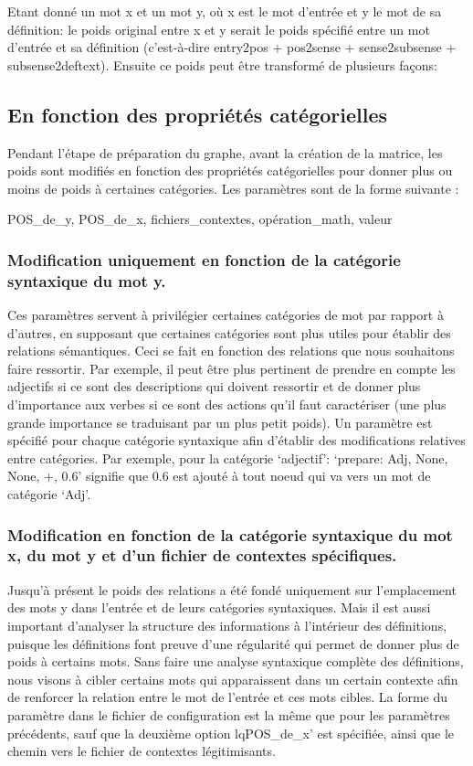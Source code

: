 Etant donné un mot x et un mot y, où x est le mot d'entrée et y le mot de sa 
définition: le poids original entre x et y serait le poids spécifié entre un mot d'entrée et 
sa définition (c'est-à-dire entry2pos + pos2sense + sense2subsense + 
subsense2deftext). Ensuite ce poids peut être transformé de plusieurs façons:

\subsection{En fonction des propriétés catégorielles}
Pendant l'étape de préparation du graphe, avant la création de la matrice, les 
poids sont modifiés en fonction des propriétés catégorielles pour donner plus 
ou moins de poids à certaines catégories. Les paramètres sont de la forme 
suivante :
    \begin{framed}
        POS\_de\_y, POS\_de\_x, fichiers\_contextes, opération\_math, valeur
    \end{framed}

\subsubsection{Modification uniquement en fonction de la catégorie 
syntaxique du mot y.}
Ces paramètres servent à privilégier certaines catégories de mot par rapport à 
d'autres, en supposant que certaines catégories sont plus utiles pour établir 
des relations sémantiques. Ceci se fait en fonction des relations que nous souhaitons faire ressortir. Par exemple, il peut être plus pertinent de prendre en compte les adjectifs si ce sont des descriptions qui doivent ressortir et de donner plus d'importance aux verbes si ce sont des actions qu'il faut caractériser (une plus grande importance se traduisant par un plus petit poids). Un paramètre est spécifié pour 
chaque catégorie syntaxique afin d'établir des modifications relatives entre 
catégories. Par exemple, pour la catégorie \lq{adjectif}\rq: \lq{prepare: Adj, 
None, None, +, 0.6}\rq{} signifie que 0.6 est ajouté à tout noeud qui va vers un 
mot de catégorie \lq{Adj}\rq{}.

\subsubsection{Modification en fonction de la catégorie syntaxique du mot x, du 
mot y et d'un fichier de contextes spécifiques.} 
Jusqu'à présent le poids des relations a été fondé uniquement sur l'emplacement 
des mots y dans l'entrée et de leurs catégories syntaxiques. Mais il est aussi 
important d'analyser la structure des informations à l'intérieur des 
définitions, puisque les définitions font preuve d'une régularité qui permet de 
donner plus de poids à certains mots. Sans faire une analyse syntaxique complète 
des définitions, nous visons à cibler certains mots qui apparaissent dans un 
certain contexte afin de renforcer la relation entre le mot de l'entrée et ces 
mots cibles. La forme du paramètre dans le fichier de configuration est la même 
que pour les paramètres précédents, sauf que la deuxième option 
lq{POS\_de\_x}\rq{} est spécifiée, ainsi que le chemin vers le fichier de 
contextes légitimisants.

